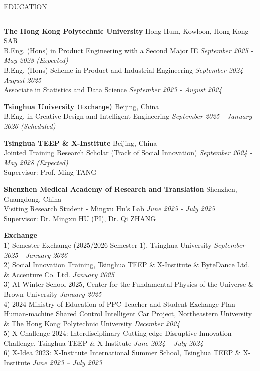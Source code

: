 \documentclass{resume} %
\renewenvironment{rSection}[1]{
\sectionskip
\textcolor{TsinghuaPurple}{\MakeUppercase{#1}}
\sectionlineskip
\hrule
\begin{list}{}{
\setlength{\leftmargin}{0em}
}
\item[]
}{
\end{list}
}
\begin{document}
  


\begin{rSection}{Education}
{\bf The Hong Kong Polytechnic University} \hfill {Hong Hum, Kowloon, Hong Kong SAR}\\
{B.Eng. (Hons) in Product Engineering with a Second Major IE} \hfill \textit{September 2025 - May 2028 (Expected)}\\
{B.Eng. (Hons) Scheme in Product and Industrial Engineering} \hfill \textit{September 2024 - August 2025}\\
{Associate in Statistics and Data Science} \hfill \textit{September 2023 - August 2024}

{\bf Tsinghua University} \texttt{(Exchange)} \hfill {Beijing, China}\\
{B.Eng. in Creative Design and Intelligent Engineering} \hfill \textit{September 2025 - January 2026 (Scheduled)}

{\bf Tsinghua TEEP \& X-Institute} \hfill {Beijing, China}\\
{Jointed Training Research Scholar (Track of Social Innovation)} \hfill \textit{September 2024 - May 2028 (Expected)}\\
{Supervisor: Prof. Ming TANG}

{\bf Shenzhen Medical Academy of Research and Translation} \hfill {Shenzhen, Guangdong, China}\\
{Visiting Research Student - Mingxu Hu's Lab} \hfill \textit{June 2025 - July 2025}\\
{Supervisor: Dr. Mingxu HU (PI), Dr. Qi ZHANG}

{\bf Exchange}\\
1)	Semester Exchange (2025/2026 Semester 1), Tsinghua University	\hfill \textit{September 2025 - January 2026}\\
2)	Social Innovation Training, Tsinghua TEEP \& X-Institute \& ByteDance Ltd. \& Accenture Co. Ltd.	 \hfill \textit{January 2025}\\
3)	AI Winter School 2025, Center for the Fundamental Physics of the Universe \& Brown University	 \hfill \textit{January 2025}\\
4)	2024 Ministry of Education of PPC Teacher and Student Exchange Plan - Human-machine Shared Control Intelligent Car  Project, Northeastern University \& The Hong Kong Polytechnic University \hfill \textit{December 2024}\\
5)	X-Challenge 2024: Interdisciplinary Cutting-edge Disruptive Innovation Challenge, Tsinghua TEEP \& X-Institute \hfill \textit{June 2024 -- July 2024}\\
6)	X-Idea 2023: X-Institute International Summer School, Tsinghua TEEP \& X-Institute \hfill \textit{June 2023 -- July 2023}\\
\end{rSection} 
\end{document}
